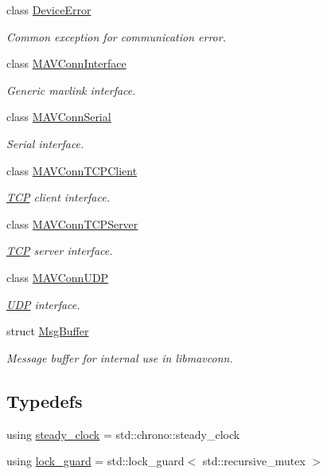\begin{DoxyCompactItemize}
\item 
class \mbox{\hyperlink{classmavconn_1_1DeviceError}{Device\+Error}}
\begin{DoxyCompactList}\small\item\em Common exception for communication error. \end{DoxyCompactList}\item 
class \mbox{\hyperlink{classmavconn_1_1MAVConnInterface}{M\+A\+V\+Conn\+Interface}}
\begin{DoxyCompactList}\small\item\em Generic mavlink interface. \end{DoxyCompactList}\item 
class \mbox{\hyperlink{classmavconn_1_1MAVConnSerial}{M\+A\+V\+Conn\+Serial}}
\begin{DoxyCompactList}\small\item\em Serial interface. \end{DoxyCompactList}\item 
class \mbox{\hyperlink{classmavconn_1_1MAVConnTCPClient}{M\+A\+V\+Conn\+T\+C\+P\+Client}}
\begin{DoxyCompactList}\small\item\em \mbox{\hyperlink{classTCP}{T\+CP}} client interface. \end{DoxyCompactList}\item 
class \mbox{\hyperlink{classmavconn_1_1MAVConnTCPServer}{M\+A\+V\+Conn\+T\+C\+P\+Server}}
\begin{DoxyCompactList}\small\item\em \mbox{\hyperlink{classTCP}{T\+CP}} server interface. \end{DoxyCompactList}\item 
class \mbox{\hyperlink{classmavconn_1_1MAVConnUDP}{M\+A\+V\+Conn\+U\+DP}}
\begin{DoxyCompactList}\small\item\em \mbox{\hyperlink{classUDP}{U\+DP}} interface. \end{DoxyCompactList}\item 
struct \mbox{\hyperlink{structmavconn_1_1MsgBuffer}{Msg\+Buffer}}
\begin{DoxyCompactList}\small\item\em Message buffer for internal use in libmavconn. \end{DoxyCompactList}\end{DoxyCompactItemize}
\subsection*{Typedefs}
\begin{DoxyCompactItemize}
\item 
using \mbox{\hyperlink{group__mavconn_gab7fe4e29d643505aafb15c532a9338d3}{steady\+\_\+clock}} = std\+::chrono\+::steady\+\_\+clock
\item 
using \mbox{\hyperlink{group__mavconn_ga46feb20496b24d733abd4e68ef29bc90}{lock\+\_\+guard}} = std\+::lock\+\_\+guard$<$ std\+::recursive\+\_\+mutex $>$
\end{DoxyCompactItemize}
